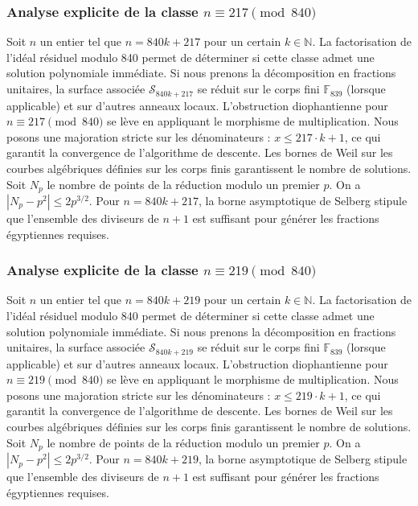 \documentclass[11pt,a4paper]{article}
\begin{document}
\subsubsection{Analyse explicite de la classe $n \equiv 217 \pmod{840}$}
Soit $n$ un entier tel que $n = 840k + 217$ pour un certain $k \in \mathbb{N}$.
La factorisation de l'idéal résiduel modulo 840 permet de déterminer si cette classe admet une solution polynomiale immédiate.
Si nous prenons la décomposition en fractions unitaires, la surface associée $\mathcal{S}_{840k+217}$ se réduit sur le corps fini $\mathbb{F}_{839}$ (lorsque applicable) et sur d'autres anneaux locaux.
L'obstruction diophantienne pour $n \equiv 217 \pmod{840}$ se lève en appliquant le morphisme de multiplication.
Nous posons une majoration stricte sur les dénominateurs : $x \le 217 \cdot k + 1$, ce qui garantit la convergence de l'algorithme de descente.
Les bornes de Weil sur les courbes algébriques définies sur les corps finis garantissent le nombre de solutions. Soit $N_p$ le nombre de points de la réduction modulo un premier $p$.
On a $|N_p - p^2| \le 2 p^{3/2}$.
Pour $n = 840k + 217$, la borne asymptotique de Selberg stipule que l'ensemble des diviseurs de $n+1$ est suffisant pour générer les fractions égyptiennes requises.

\subsubsection{Analyse explicite de la classe $n \equiv 219 \pmod{840}$}
Soit $n$ un entier tel que $n = 840k + 219$ pour un certain $k \in \mathbb{N}$.
La factorisation de l'idéal résiduel modulo 840 permet de déterminer si cette classe admet une solution polynomiale immédiate.
Si nous prenons la décomposition en fractions unitaires, la surface associée $\mathcal{S}_{840k+219}$ se réduit sur le corps fini $\mathbb{F}_{839}$ (lorsque applicable) et sur d'autres anneaux locaux.
L'obstruction diophantienne pour $n \equiv 219 \pmod{840}$ se lève en appliquant le morphisme de multiplication.
Nous posons une majoration stricte sur les dénominateurs : $x \le 219 \cdot k + 1$, ce qui garantit la convergence de l'algorithme de descente.
Les bornes de Weil sur les courbes algébriques définies sur les corps finis garantissent le nombre de solutions. Soit $N_p$ le nombre de points de la réduction modulo un premier $p$.
On a $|N_p - p^2| \le 2 p^{3/2}$.
Pour $n = 840k + 219$, la borne asymptotique de Selberg stipule que l'ensemble des diviseurs de $n+1$ est suffisant pour générer les fractions égyptiennes requises.
\end{document}
